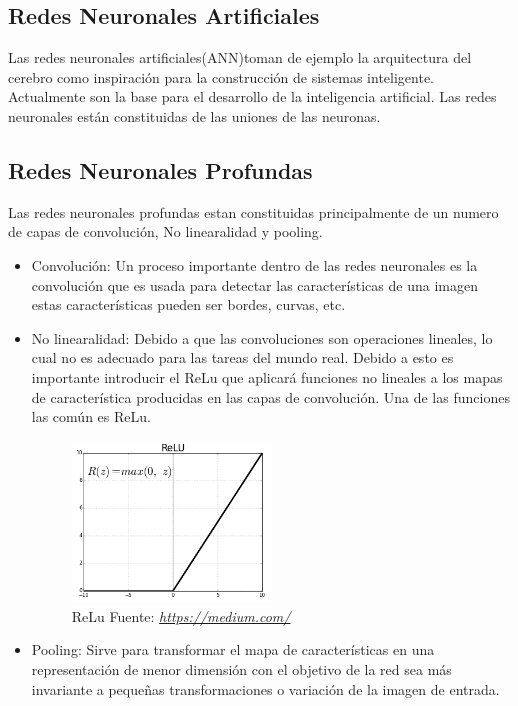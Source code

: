 \subsection*{Redes Neuronales Artificiales}
Las redes neuronales artificiales(ANN)toman de ejemplo la arquitectura del cerebro como inspiración para la construcción de sistemas inteligente. Actualmente son la base para el desarrollo de la inteligencia artificial. Las redes neuronales están constituidas de las uniones de las neuronas. 
\subsection*{Redes Neuronales Profundas}


Las redes neuronales profundas estan constituidas principalmente de un numero de capas de convolución, No linearalidad y pooling.
\begin{itemize}
	\item Convolución:
	Un proceso importante dentro de las redes neuronales es la convolución que es usada para detectar las características de una imagen estas características pueden ser bordes, curvas, etc.
	\item No linearalidad:
	Debido a que las convoluciones son operaciones lineales, lo cual no es adecuado para las tareas del mundo real. Debido a esto es importante introducir el ReLu que aplicará funciones no lineales a los mapas de característica producidas en las capas de convolución.
	Una de las funciones las común es ReLu.
	\begin{figure}[H]
		\centering
		\includegraphics[width=0.5\textwidth]{Figures/relu.png}
		\caption{ReLu  Fuente:
			\href{https://medium.com/@kanchansarkar/relu-not-a-differentiable-function-why-used-in-gradient-based-optimization-7fef3a4cecec}{\textit{https://medium.com/}}
			 }
		\label{ReLu}
	\end{figure}

	
	\item Pooling:
	Sirve para transformar el mapa de características en una representación de menor dimensión con el objetivo de la red sea más invariante a pequeñas transformaciones o variación de la imagen de entrada.
\end{itemize}






\afterpage{\blankpage}